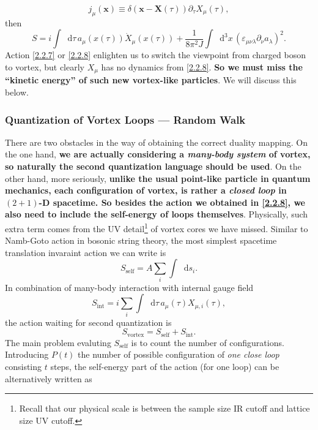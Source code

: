 \documentclass[10pt,nofootinbib]{revtex4}
\newcommand*\dd{\mathop{}\!\mathrm{d}}
\numberwithin{equation}{section}
\begin{document}
		\begin{equation*}
			j_\mu(\bm{x})\equiv \delta(\bm{x}-\bm{X}(\tau))\partial_\tau X_\mu(\tau),
		\end{equation*}
		then
		\begin{equation}\label{2.2.8}
			S=i\int\dd\tau\,a_\mu(x(\tau))\dot{X}_\mu(x(\tau))+\dfrac{1}{8\pi^2 J}\int\dd^3x\,(\varepsilon_{\mu\nu\lambda}\partial_\nu a_{\lambda})^2.
		\end{equation}
		Action \eqref{2.2.7} or \eqref{2.2.8} enlighten us to switch the viewpoint from charged boson to vortex, but clearly $X_\mu$ has no dynamics from \eqref{2.2.8}. \textbf{So we must miss the ``kinetic energy'' of such new vortex-like particles}. We will discuss this below.

		\subsubsection{Quantization of Vortex Loops --- Random Walk}
		There are two obstacles in the way of obtaining the correct duality mapping. On the one hand, \textbf{we are actually considering a \emph{many-body system} of vortex, so naturally the second quantization language should be used}. On the other hand, more seriously, {\bf unlike the usual point-like particle in quantum mechanics, each configuration of vortex, is rather a \emph{closed loop} in $(2+1)$-D spacetime. So besides the action we obtained in \eqref{2.2.8}, we also need to include the self-energy \cite{banks1977phase} of loops themselves}. Physically, such extra term comes from  the UV detail\footnote{Recall that our physical scale is between the sample size IR cutoff and lattice size UV cutoff.} of vortex cores we have missed. Similar to Namb-Goto action in bosonic string theory, the most simplest spacetime translation invaraint action we can write is
		\begin{equation*}
			S_{\text{self}}=A\sum_i\int\dd s_i.
		\end{equation*}
		In combination of many-body interaction with internal gauge field
		\begin{equation*}
			S_{\text{int}}=i\sum_i\int\dd\tau\,a_\mu(\tau) X_{\mu,i}(\tau),			
		\end{equation*}		
		the action waiting for second quantization is
		\begin{equation*}
			S_{\text{vortex}}=S_{\text{self}}+S_{\text{int}}.
		\end{equation*}
		The main problem evaluting $S_{\text{self}}$ is to count the number of configurations. Introducing $P(t)$ the number of possible configuration of \emph{one close loop} consisting $t$ steps, the self-energy part of the action (for one loop) can be alternatively written as
\end{document}
